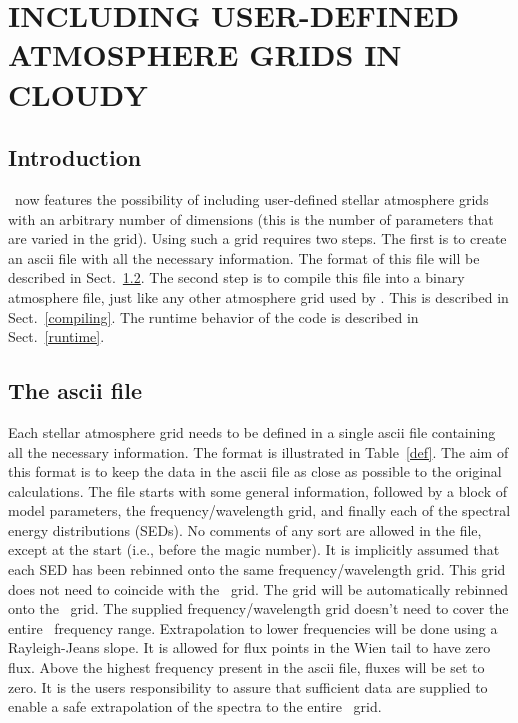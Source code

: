 \chapter{INCLUDING USER-DEFINED ATMOSPHERE GRIDS IN CLOUDY}

\section{Introduction}

\Cloudy\ now features the possibility of including user-defined stellar
atmosphere grids with an arbitrary number of dimensions (this is the number of
parameters that are varied in the grid). Using such a grid requires two steps.
The first is to create an ascii file with all the necessary information. The
format of this file will be described in Sect.~\ref{ascii}. The second step is
to compile this file into a binary atmosphere file, just like any other
atmosphere grid used by \Cloudy. This is described in Sect.~\ref{compiling}.
The runtime behavior of the code is described in Sect.~\ref{runtime}.

\section{The ascii file}
\label{ascii}

Each stellar atmosphere grid needs to be defined in a single ascii file
containing all the necessary information. The format is illustrated in
Table~\ref{def}. The aim of this format is to keep the data in the ascii file
as close as possible to the original calculations. The file starts with some
general information, followed by a block of model parameters, the
frequency/wavelength grid, and finally each of the spectral energy
distributions (SEDs). No comments of any sort are allowed in the file, except
at the start (i.e., before the magic number). It is implicitly assumed that
each SED has been rebinned onto the same frequency/wavelength grid. This grid
does not need to coincide with the \Cloudy\ grid. The grid will be automatically
rebinned onto the \Cloudy\ grid. The supplied frequency/wavelength grid doesn't
need to cover the entire \Cloudy\ frequency range. Extrapolation to lower
frequencies will be done using a Rayleigh-Jeans slope. It is allowed for flux
points in the Wien tail to have zero flux. Above the highest frequency present
in the ascii file, fluxes will be set to zero. It is the users responsibility
to assure that sufficient data are supplied to enable a safe extrapolation of
the spectra to the entire \Cloudy\ grid.

